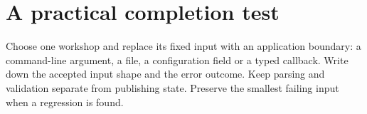 \section*{A practical completion test}
Choose one workshop and replace its fixed input with an application boundary: a command-line argument, a file, a configuration field or a typed callback. Write down the accepted input shape and the error outcome. Keep parsing and validation separate from publishing state. Preserve the smallest failing input when a regression is found.

